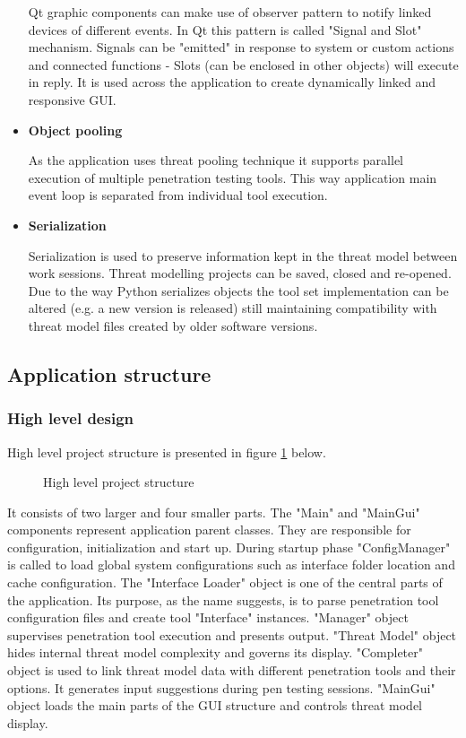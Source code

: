 \begin{itemize}
	Qt graphic components can make use of observer pattern to notify linked devices of different events. In Qt this pattern is called "Signal and Slot" mechanism. Signals can be "emitted" in response to system or custom actions and connected functions - Slots (can be enclosed in other objects) will execute in reply. It is used across the application to create dynamically linked and responsive GUI.
	
	\item \textbf{Object pooling}
	
	As the application uses threat pooling technique it supports parallel execution of multiple penetration testing tools. This way application main event loop is separated from individual tool execution.
	
	\item \textbf{Serialization}
	
	Serialization is used to preserve information kept in the threat model between work sessions. Threat modelling projects can be saved, closed and re-opened. Due to the way Python serializes objects the tool set implementation can be altered (e.g. a new version is released) still maintaining compatibility with threat model files created by older software versions.
	
\end{itemize}

\subsection{Application structure}

\subsubsection{High level design}
High level project structure is presented in figure \ref{fig:high-level-struct} below.

\begin{figure}[!htb]
	\caption{\label{fig:high-level-struct} High level project structure}
\end{figure}

It consists of two larger and four smaller parts. The "Main" and "MainGui" components represent application parent classes. They are responsible for configuration, initialization and start up. During startup phase "ConfigManager" is called to load global system configurations such as interface folder location and cache configuration. The "Interface Loader" object is one of the central parts of the application. Its purpose, as the name suggests, is to parse penetration tool configuration files and create tool "Interface" instances. "Manager" object supervises penetration tool execution and presents output.
"Threat Model" object hides internal threat model complexity and governs its display. "Completer" object is used to link threat model data with different penetration tools and their options. It generates input suggestions during pen testing sessions. 
"MainGui" object loads the main parts of the GUI structure and controls threat model display.

